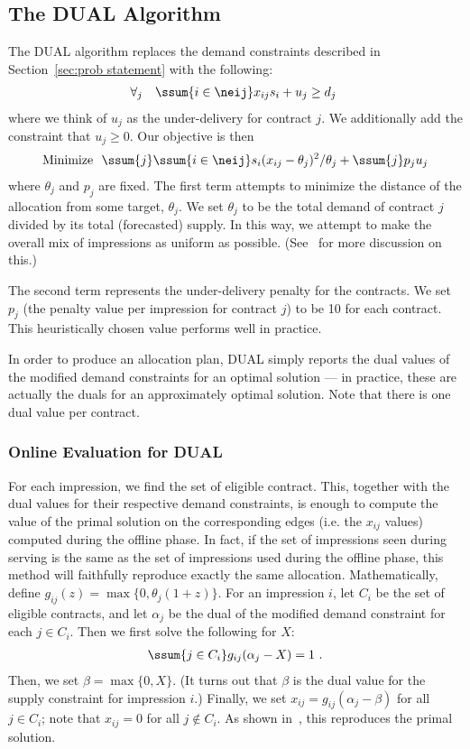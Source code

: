 \subsection{The DUAL Algorithm}
The DUAL algorithm replaces the demand constraints described in
Section~\ref{sec:prob statement} with the following:
\begin{align*}\itemsep=0in
\mbox{\ \ }
        & \forall_j \ \ \ \ssum{i \in \neij} x_{ij} s_i +u_j \ge d_j &
\end{align*}
where we think of $u_j$ as the under-delivery for contract $j$.  We
additionally add the constraint that $u_j \ge 0$.  Our objective is
then
\begin{align*}\itemsep=0in
\mbox{Minimize\ \ } \ssum{j} \ssum{i \in \neij} s_i (x_{ij} -
\theta_{j})^2/\theta_{j} +
    \ssum{j} p_j u_j
\end{align*}
where $\theta_j$ and $p_j$ are fixed.  The first term attempts to
minimize the distance of the allocation from some target,
$\theta_j$.  We set $\theta_j$ to be the total demand of contract
$j$ divided by its total (forecasted) supply.  In this way, we
attempt to make the overall mix of impressions as uniform as
possible.  (See~\cite{Informs,CIKM,Ghosh,KDD} for more discussion
on this.)

The second term represents the under-delivery penalty for the
contracts.  We set $p_j$ (the penalty value per impression for
contract $j$) to be 10 for each contract.  This heuristically chosen
value performs well in practice.

In order to produce an allocation plan, DUAL simply reports the dual
values of the modified demand constraints for an optimal solution
--- in practice, these are actually the duals for an approximately
optimal solution.  Note that there is one dual value per contract.

\subsubsection{Online Evaluation for DUAL}
For each impression, we find the set of eligible contract.  This,
together with the dual values for their respective demand
constraints, is enough to compute the value of the primal solution
on the corresponding edges (i.e. the $x_{ij}$ values) computed
during the offline phase.  In fact, if the set of impressions seen
during serving is the same as the set of impressions used during the
offline phase, this method will faithfully reproduce exactly the
same allocation. Mathematically, define $g_{ij}(z) = \max\{0,
\theta_j (1+z)\}$.  For an impression $i$, let $C_i$ be the set of
eligible contracts, and let $\alpha_j$ be the dual of the modified
demand constraint for each $j\in C_i$.  Then we first solve the
following for $X$:
\begin{align*}\itemsep=0in
\ssum{j\in C_i} g_{ij}(\alpha_j - X) = 1\ .
\end{align*}
Then, we set $\beta = \max\{0, X\}$.  (It turns out that $\beta$ is
the dual value for the supply constraint for impression $i$.)
Finally, we set $x_{ij} = g_{ij}(\alpha_j - \beta)$ for all $j\in
C_i$; note that $x_{ij} = 0$ for all $j\notin C_i$.
As shown in~\cite{EC}, this reproduces the primal solution.

